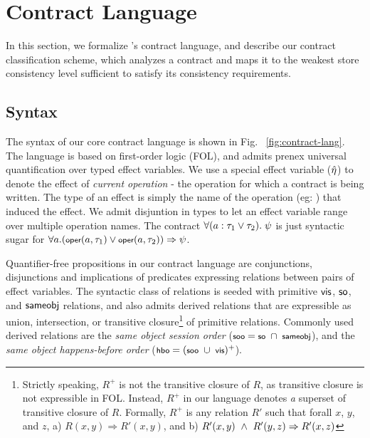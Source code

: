 \section{Contract Language}
\label{sec:contract-lang}



In this section, we formalize \name's contract language, and describe our
contract classification scheme, which analyzes a contract and maps it to the
weakest store consistency level sufficient to satisfy its consistency
requirements.


\subsection{Syntax}

The syntax of our core contract language is shown in Fig.
~\ref{fig:contract-lang}. The language is based on first-order logic (FOL), and
admits prenex universal quantification over typed effect variables. We use a
special effect variable ($\hat{\eta}$) to denote the effect of \emph{current
operation} - the operation for which a contract is being written. The type of
an effect is simply the name of the operation (eg: ) that induced
the effect. We admit disjuntion in types to let an effect variable range over
multiple operation names. The contract $\small \forall (a : \tau_1 \vee
\tau_2).~\psi$ is just syntactic sugar for $\small \forall a. (\oper{a}{\tau_1}
\vee \oper{a}{\tau_2}) \Rightarrow \psi$.

Quantifier-free propositions in our contract language are conjunctions,
disjunctions and implications of predicates expressing relations between pairs
of effect variables. The syntactic class of relations is seeded with primitive
${\normalfont \textsf{vis}}$, ${\normalfont \textsf{so}}$, and ${\normalfont \textsf{sameobj}}$ relations, and also admits derived relations
that are expressible as union, intersection, or transitive
closure\footnote{Strictly speaking, $R^{+}$ is not the transitive closure of
$R$, as transitive closure is not expressible in FOL.  Instead, $R^{+}$ in our
language denotes \emph{a} superset of transitive closure of $R$. Formally,
$R^{+}$ is any relation $R'$ such that forall $x$, $y$, and $z$, a) $R(x,y)
\Rightarrow R'(x,y)$, and b) $R'(x,y) ~\wedge~ R'(y,z) \Rightarrow R'(x,z)$} of
primitive relations.  Commonly used derived relations are the \emph{same object
session order} ($\small \sooZ = \soZ ~\cap~ \sameobjZ$), and the \emph{same
object happens-before order} ($\small \hboZ = (\sooZ ~\cup~ \visZ)^+$).

